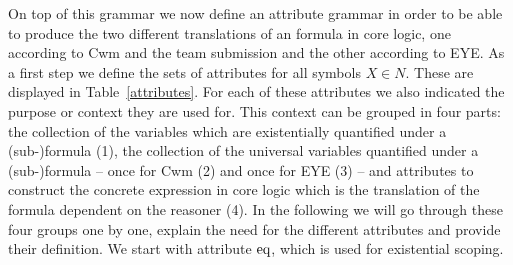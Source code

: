 On top of this grammar we now define an attribute grammar in order to be able to produce the two different translations %
of an \nthree formula in core logic, one according to Cwm and the team submission and the other according to EYE.
As a first step we define the sets of attributes for all symbols $X\in N$.
These are displayed in Table~\ref{attributes}. 
For each of these attributes we also indicated the purpose or context they are used for. This context can be grouped in four parts:  the collection of the variables which are existentially 
quantified under a (sub-)formula (1), the collection
of the universal variables quantified under a (sub-)formula -- once for Cwm (2) and once for EYE (3) -- and attributes to construct the concrete 
expression in core logic which is the translation of the \nthree 
formula dependent on the reasoner (4).
In the following we will go through these four groups one by one, explain the need for the different attributes and provide their definition. We start with attribute $\text{eq}$, which is used for existential scoping. 

